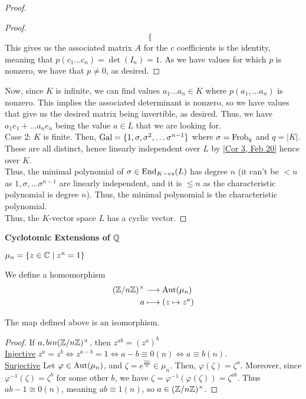 \begin{proof}
\begin{proof}
$$\begin{cases}
   \end{cases}
    $$
    This gives us the associated matrix $A$ for the $c$ coefficients is the identity,
    meaning that $p(c_1 \dots c_n) = \det(I_n) = 1$. As we have values for which $p$
    is nonzero, we have that $p \neq 0$, as desired.
\end{proof}
Now, since $K$ is infinite, we can find values $a_1 \dots a_n \in K$ where
$p(a_1, \dots a_n)$ is nonzero. This implies the associated determinant is nonzero,
so we have values that give us the desired matrix being invertible, as desired. Thus,
we have $a_1e_1 + \dots a_ne_n$ being the value $a \in L$ that we are looking for. \\
Case 2: $K$ is finite. Then, $\operatorname{Gal} = \{1, \sigma, \sigma^2, \dots \sigma^{n-1}\}$
where $\sigma = \operatorname{Frob}_q$ and $q = |K|$. These are all distinct, hence linearly
independent over $L$ by \ref{Cor 3, Feb 20} hence over $K$. \\
Thus, the minimal polynomial of $\sigma \in \operatorname{End}_{K-vs}(L)$ has degree $n$
(it can't be $< n$ as $1, \sigma, \dots \sigma^{n-1}$ are linearly independent, and it is
$\leq n$ as the characteristic polynomial is degree $n$). Thus, the minimal polynomial
is the characteristic polynomial. \\
Thus, the $K$-vector space $L$ has a cyclic vector.
\end{proof}
\noindent \textbf{Cyclotomic Extensions of $\mathbb{Q}$}
\begin{defn} \label{Defn 2, Feb 22}
    $\mu_n = \{z \in \mathbb{C} \mid z^n = 1 \}$
\end{defn}
We define a homomorphism
\begin{align*}
    (\mathbb{Z} / n \mathbb{Z})^\times  &\longrightarrow \operatorname{Aut}(\mu_n) \\
    a &\longmapsto (z \mapsto z^a)
\end{align*}
\begin{fact} \label{Fact 3, Feb 22}
    The map defined above is an isomorphism.
\end{fact}
\begin{proof}
    If $a,b in (\mathbb{Z} / n \mathbb{Z})^\times$, then $z^{ab} = (z^a)^b$ \\
    \underline{Injective} $z^a = z^b \Leftrightarrow z^{a-b} = 1 \Leftrightarrow a - b \equiv 0 (n) \Leftrightarrow a \equiv b (n)$. \\
    \underline{Surjective} Let $\varphi \in \operatorname{Aut}(\mu_n)$, and $\zeta = e^{\frac{2 \pi i}{n}} \in \mu_n$. Then,
    $\varphi(\zeta) = \zeta^a$. Moreover, since $\varphi^{-1}(\zeta) = \zeta^b$ for some other $b$,
    we have $\zeta = \varphi^{-1}(\varphi(\zeta)) = \zeta^{ab}$. Thus $ab - 1 \cong 0 (n)$, meaning
    $ab \equiv 1 (n)$, so $a \in (\mathbb{Z} / n \mathbb{Z})^\times$.
\end{proof}
